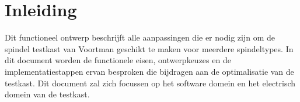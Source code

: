 \section{Inleiding}

Dit functioneel ontwerp beschrijft alle aanpassingen die er nodig zijn om de spindel testkast van Voortman geschikt te maken voor meerdere spindeltypes. In dit document worden de functionele eisen, ontwerpkeuzes en de implementatiestappen ervan besproken die bijdragen aan de optimalisatie van de testkast. Dit document zal zich focussen op het software domein en het electrisch domein van de testkast.
